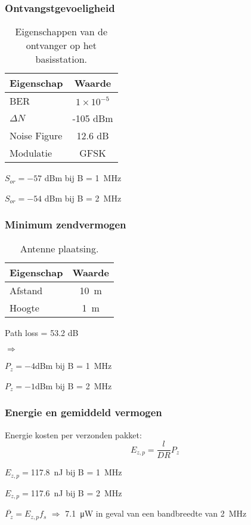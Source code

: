\begin{frame}
    \frametitle{Ontvangstgevoeligheid}

    \begin{table}
        \centering
        \begin{tabular}{l|c}
            Eigenschap & Waarde \\\hline
            BER & $1\times10^{-5}$ \\
            $\Delta N$ & -105 dBm \\
            Noise Figure & 12.6 dB \\
            Modulatie & GFSK \\
        \end{tabular}
        \caption{Eigenschappen van de ontvanger op het basisstation.}
    \end{table}

    \pause 

    $S_{or}=-57$ dBm bij B = \qty{1}{\mega\hertz}

    $S_{or}=-54$ dBm bij B = \qty{2}{\mega\hertz}

\end{frame}

\begin{frame}
    \frametitle{Minimum zendvermogen}

    \begin{table}
        \centering
        \begin{tabular}{l|c}
            Eigenschap & Waarde \\\hline
            Afstand & \qty{10}{\meter} \\
            Hoogte & \qty{1}{\meter} \\
        \end{tabular}
        \caption{Antenne plaatsing.}
    \end{table}

    Path loss = 53.2 dB

    \pause

    $\Rightarrow$

    $P_{z}=-4$dBm bij B = \qty{1}{\mega\hertz}

    $P_{z}=-1$dBm bij B = \qty{2}{\mega\hertz}
\end{frame}

\begin{frame}
    \frametitle{Energie en gemiddeld vermogen}

    Energie kosten per verzonden pakket:
    \begin{equation*}
        E_{z,p}=\frac{l}{DR}P_z
    \end{equation*}

    \pause

    $E_{z,p}=$\qty{117.8}{\nano\joule} bij B = \qty{1}{\mega\hertz}

    $E_{z,p}=$\qty{117.6}{\nano\joule} bij B = \qty{2}{\mega\hertz}

    \pause

    \vspace{1cm}
    $\overline{P_z}=E_{z,p}f_s$ $\Rightarrow$ \qty{7.1}{\micro\watt} in geval van een bandbreedte van \qty{2}{\mega\hertz}

\end{frame}